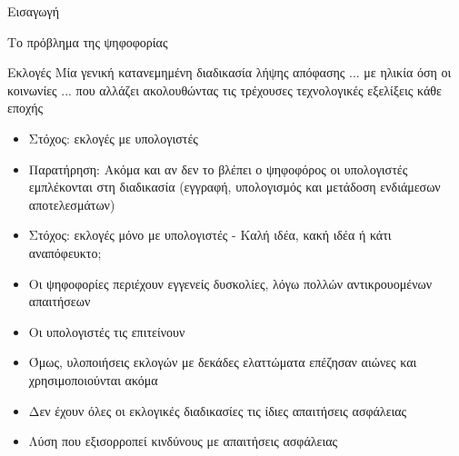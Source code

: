 \documentclass[handout]{beamer}
\begin{document}
\begin{section}{Εισαγωγή}
\begin{frame}{Το πρόβλημα της ψηφοφορίας}
\begin{block}{Εκλογές}
   Μία γενική κατανεμημένη διαδικασία λήψης απόφασης ... με ηλικία όση οι κοινωνίες ... που αλλάζει ακολουθώντας τις τρέχουσες τεχνολογικές εξελίξεις κάθε εποχής
\end{block}
\pause
\begin{tiny}
\begin{itemize}
    \item Στόχος: εκλογές με υπολογιστές \pause
    \item Παρατήρηση: Ακόμα και αν δεν το βλέπει ο ψηφοφόρος οι υπολογιστές εμπλέκονται στη διαδικασία (εγγραφή, υπολογισμός και μετάδοση ενδιάμεσων αποτελεσμάτων) \pause
    \item Στόχος: εκλογές \alert{μόνο με υπολογιστές} - Καλή ιδέα, κακή ιδέα ή κάτι αναπόφευκτο; \pause
    \item Οι ψηφοφορίες περιέχουν εγγενείς δυσκολίες, λόγω πολλών αντικρουομένων απαιτήσεων \pause
    \item Οι υπολογιστές τις επιτείνουν \pause
    \item Όμως, υλοποιήσεις εκλογών με δεκάδες ελαττώματα επέζησαν αιώνες και χρησιμοποιούνται ακόμα \pause
    \item Δεν έχουν όλες οι εκλογικές διαδικασίες τις ίδιες απαιτήσεις ασφάλειας
    \item Λύση που εξισορροπεί κινδύνους με απαιτήσεις ασφάλειας
\end{itemize}
\end{tiny}
\end{frame}
\end{section}
\end{document}
